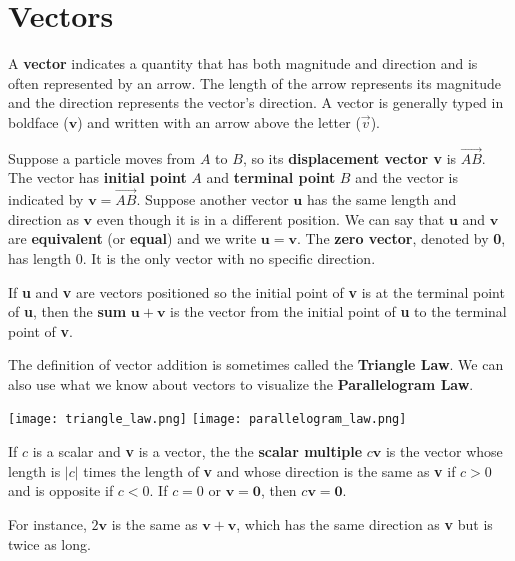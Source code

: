 \section{Vectors}
  A \textbf{vector} indicates a quantity that has both magnitude and direction and is often represented by an arrow. The length of the arrow represents its magnitude and the direction represents the vector's direction. A vector is generally typed in boldface ($\mathbf{v}$) and written with an arrow above the letter ($\vec{v}$).\par
  Suppose a particle moves from $A$ to $B$, so its \textbf{displacement vector v} is $\vec{AB}$. The vector has \textbf{initial point} $A$ and \textbf{terminal point} $B$ and the vector is indicated by $\mathbf{v}=\vec{AB}$. Suppose another vector $\mathbf{u}$ has the same length and direction as $\mathbf{v}$ even though it is in a different position. We can say that $\mathbf{u}$ and $\mathbf{v}$ are \textbf{equivalent} (or \textbf{equal}) and we write $\mathbf{u} = \mathbf{v}$. The \textbf{zero vector}, denoted by \textbf{0}, has length 0. It is the only vector with no specific direction.
  \begin{definition}
    If \textbf{u} and \textbf{v} are vectors positioned so the initial point of \textbf{v} is at the terminal point of \textbf{u}, then the \textbf{sum} $\mathbf{u} + \mathbf{v}$ is the vector from the initial point of \textbf{u} to the terminal point of \textbf{v}.
  \end{definition}
  The definition of vector addition is sometimes called the \textbf{Triangle Law}. We can also use what we know about vectors to visualize the \textbf{Parallelogram Law}.
  \begin{center}
    \texttt{[image: triangle\_law.png]}
    \hspace{45pt}
    \texttt{[image: parallelogram\_law.png]}
  \end{center}
  \begin{definition}
    If $c$ is a scalar and \textbf{v} is a vector, the the \textbf{scalar multiple} $c \mathbf{v}$ is the vector whose length is $|c|$ times the length of \textbf{v} and whose direction is the same as \textbf{v} if $c>0$ and is opposite if $c<0$. If $c=0$ or $\mathbf{v} = \mathbf{0}$, then $c\mathbf{v}=\mathbf{0}$.
  \end{definition}
  For instance, $2 \mathbf{v}$ is the same as $\mathbf{v} + \mathbf{v}$, which has the same direction as \textbf{v} but is twice as long.\par

